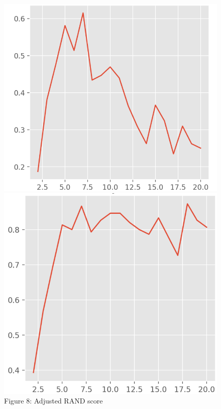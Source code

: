 \documentclass[12pt,article]{article}
\begin{document}
\begin{figure}[H]
\centering
\begin{minipage}{.4\textwidth}
  \centering
  \includegraphics[width=1\linewidth]{images/RAND_graph.png}
  \captionsetup{labelformat=empty}
  \caption{\scriptsize{Figure 8: Adjusted RAND score}}
  \label{fig:test1}
\end{minipage}%
\vspace{15pt}
\begin{minipage}{.37\textwidth}
  \centering
  \includegraphics[width=1\linewidth]{images/Purity_graph.png}

\end{minipage}
\end{figure}
\end{document}
